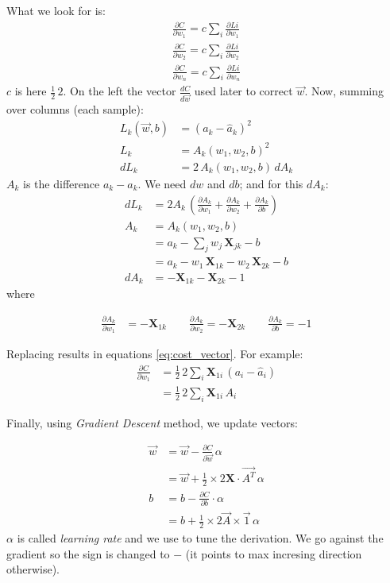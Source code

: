 What we look for is:
\begin{align}
  \frac{\partial C}{\partial w_1} = c\sum_i \frac{\partial Li}{\partial w_1}\nonumber\\
  \frac{\partial C}{\partial w_2} = c\sum_i \frac{\partial Li}{\partial w_2} \nonumber\\
  \frac{\partial C}{\partial w_n} = c\sum_i \frac{\partial Li}{\partial w_n} \label{eq:cost_vector} 
\end{align}
$c$ is here $\frac{1}{2}\, 2$. On the left the vector $\frac{dC}{d\vec{w}}$ used later to correct $\vec{w}$. Now, summing over columns (each sample):
\begin{align*}
  L_k(\vec{w},b) &= (a_k - \hat{a}_k)^2\\
    L_k &= A_k(w_1, w_2, b)^2\\
    dL_k &= 2\,A_k(w_1,w_2,b)\,dA_k
\end{align*}
$A_k$ is the difference $a_k-\hat{a}_k$. We need $dw$ and $db$; and for this $dA_k$:
\begin{align*}
  dL_k  &= 2A_k\,(\frac{\partial A_k}{\partial w_1} + \frac{\partial A_k}{\partial w_2} + \frac{\partial A_k}{\partial b}) \\
  A_k &= A_k(w_1, w_2, b)\\
  &= a_k - \sum_j w_j\,\mathbf{X}_{jk} - b\\
  &= a_k - w_1\,\mathbf{X}_{1k} - w_2\,\mathbf{X}_{2k}-b\\
  dA_k &= -\mathbf{X}_{1k} - \mathbf{X}_{2k} -1
\end{align*}
where 
\begin{center}
\begin{align*}
  \frac{\partial A_{k}}{\partial w_1} &= -\mathbf{X}_{1k}\hspace{2em} \frac{\partial A_{k}}{\partial w_2} = -\mathbf{X}_{2k}\hspace{2em} \frac{\partial A_k}{\partial b} = -1
\end{align*} 
\end{center}
Replacing results in equations \ref{eq:cost_vector}. For example: 
\begin{align*}
  \frac{\partial C}{\partial w_1} &= \frac{1}{2}\, 2\sum_i \mathbf{X}_{1i}\,(a_i-\hat{a}_i) \\
  &= \frac{1}{2}\, 2\sum_i \mathbf{X}_{1i}\,A_i 
\end{align*}

Finally, using \textit{Gradient Descent} method, we update vectors:

\begin{align}
  \vec{w} &= \vec{w} -\frac{\partial C}{\partial \vec{w}}\,\alpha\nonumber\\
  &= \vec{w} +\frac{1}{2}\times{}2\mathbf{X}\cdot{}\vec{A^T}\,\alpha\\ 
  b &= b -\frac{\partial C}{\partial b}\cdot{}\alpha\nonumber\\
  &= b +\frac{1}{2}\times{}2\vec{A}\times{}\vec{1}\,\alpha
\end{align}
$\alpha$ is called \textit{learning rate} and we use to tune the derivation. We go against the gradient so the sign is changed to $-$ (it points to max incresing direction otherwise).

